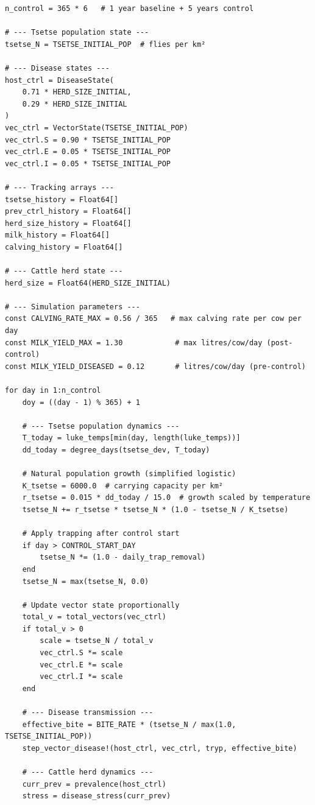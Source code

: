 \begin{verbatim}
n_control = 365 * 6   # 1 year baseline + 5 years control

# --- Tsetse population state ---
tsetse_N = TSETSE_INITIAL_POP  # flies per km²

# --- Disease states ---
host_ctrl = DiseaseState(
    0.71 * HERD_SIZE_INITIAL,
    0.29 * HERD_SIZE_INITIAL
)
vec_ctrl = VectorState(TSETSE_INITIAL_POP)
vec_ctrl.S = 0.90 * TSETSE_INITIAL_POP
vec_ctrl.E = 0.05 * TSETSE_INITIAL_POP
vec_ctrl.I = 0.05 * TSETSE_INITIAL_POP

# --- Tracking arrays ---
tsetse_history = Float64[]
prev_ctrl_history = Float64[]
herd_size_history = Float64[]
milk_history = Float64[]
calving_history = Float64[]

# --- Cattle herd state ---
herd_size = Float64(HERD_SIZE_INITIAL)

# --- Simulation parameters ---
const CALVING_RATE_MAX = 0.56 / 365   # max calving rate per cow per day
const MILK_YIELD_MAX = 1.30            # max litres/cow/day (post-control)
const MILK_YIELD_DISEASED = 0.12       # litres/cow/day (pre-control)

for day in 1:n_control
    doy = ((day - 1) % 365) + 1

    # --- Tsetse population dynamics ---
    T_today = luke_temps[min(day, length(luke_temps))]
    dd_today = degree_days(tsetse_dev, T_today)

    # Natural population growth (simplified logistic)
    K_tsetse = 6000.0  # carrying capacity per km²
    r_tsetse = 0.015 * dd_today / 15.0  # growth scaled by temperature
    tsetse_N += r_tsetse * tsetse_N * (1.0 - tsetse_N / K_tsetse)

    # Apply trapping after control start
    if day > CONTROL_START_DAY
        tsetse_N *= (1.0 - daily_trap_removal)
    end
    tsetse_N = max(tsetse_N, 0.0)

    # Update vector state proportionally
    total_v = total_vectors(vec_ctrl)
    if total_v > 0
        scale = tsetse_N / total_v
        vec_ctrl.S *= scale
        vec_ctrl.E *= scale
        vec_ctrl.I *= scale
    end

    # --- Disease transmission ---
    effective_bite = BITE_RATE * (tsetse_N / max(1.0, TSETSE_INITIAL_POP))
    step_vector_disease!(host_ctrl, vec_ctrl, tryp, effective_bite)

    # --- Cattle herd dynamics ---
    curr_prev = prevalence(host_ctrl)
    stress = disease_stress(curr_prev)


\end{verbatim}
